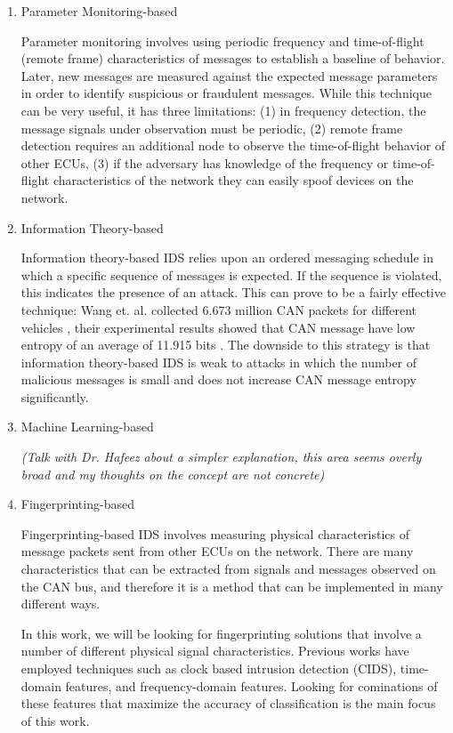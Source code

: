 \documentclass[conference]{IEEEtran}
\begin{document}
\begin{enumerate}

    \item Parameter Monitoring-based
    
        \medbreak
        Parameter monitoring involves using periodic frequency and time-of-flight (remote frame) characteristics of messages to establish a baseline of behavior. Later, new messages are measured against the expected message parameters in order to identify suspicious or fraudulent messages. While this technique can be very useful, it has three limitations: (1) in frequency detection, the message signals under observation must be periodic, (2) remote frame detection requires an additional node to observe the time-of-flight behavior of other ECUs, (3) if the adversary has knowledge of the frequency or time-of-flight characteristics of the network they can easily spoof devices on the network.
        \medbreak
        
    \item Information Theory-based
    
        \medbreak
        Information theory-based IDS relies upon an ordered messaging schedule in which a specific sequence of messages is expected. If the sequence is violated, this indicates the presence of an attack. This can prove to be a fairly effective technique: Wang et. al. collected 6.673 million CAN packets for different vehicles \cite{wang2017hardware}, their experimental results showed that CAN message have low entropy of an average of 11.915 bits \cite{wang2017hardware}. The downside to this strategy is that information theory-based IDS is weak to attacks in which the number of malicious messages is small and does not increase CAN message entropy significantly.
        \medbreak
    
    \item Machine Learning-based
    
        \medbreak
        \textit{(Talk with Dr. Hafeez about a simpler explanation, this area seems overly broad and my thoughts on the concept are not concrete)}
        \medbreak
        
    \item Fingerprinting-based
    
        \medbreak
        Fingerprinting-based IDS involves measuring physical characteristics of message packets sent from other ECUs on the network. There are many characteristics that can be extracted from signals and messages observed on the CAN bus, and therefore it is a method that can be implemented in many different ways.
        
        In this work, we will be looking for fingerprinting solutions that involve a number of different physical signal characteristics. Previous works have employed techniques such as clock based intrusion detection (CIDS), time-domain features, and frequency-domain features. Looking for cominations of these features that maximize the accuracy of classification is the main focus of this work.
        \medbreak
    
\end{enumerate}
\end{document}

